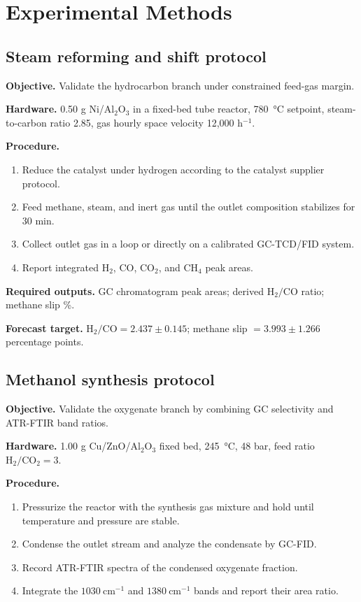 \documentclass[11pt]{article}
\begin{document}
\section{Experimental Methods}

\subsection{Steam reforming and shift protocol}

\textbf{Objective.} Validate the hydrocarbon branch under constrained feed-gas margin.

\textbf{Hardware.} 0.50 g Ni/Al\(_2\)O\(_3\) in a fixed-bed tube reactor, \SI{780}{\degreeCelsius} setpoint, steam-to-carbon ratio 2.85, gas hourly space velocity 12{,}000 h\(^{-1}\).

\textbf{Procedure.}
\begin{enumerate}[leftmargin=1.5em]
\item Reduce the catalyst under hydrogen according to the catalyst supplier protocol.
\item Feed methane, steam, and inert gas until the outlet composition stabilizes for 30 min.
\item Collect outlet gas in a loop or directly on a calibrated GC-TCD/FID system.
\item Report integrated \(\mathrm{H_2}\), \(\mathrm{CO}\), \(\mathrm{CO_2}\), and \(\mathrm{CH_4}\) peak areas.
\end{enumerate}

\textbf{Required outputs.} GC chromatogram peak areas; derived \(\mathrm{H_2/CO}\) ratio; methane slip \%.

\textbf{Forecast target.} \(\mathrm{H_2/CO} = 2.437 \pm 0.145\); methane slip \(= 3.993 \pm 1.266\) percentage points.

\subsection{Methanol synthesis protocol}

\textbf{Objective.} Validate the oxygenate branch by combining GC selectivity and ATR-FTIR band ratios.

\textbf{Hardware.} 1.00 g Cu/ZnO/Al\(_2\)O\(_3\) fixed bed, \SI{245}{\degreeCelsius}, 48 bar, feed ratio \(\mathrm{H_2/CO_2}=3\).

\textbf{Procedure.}
\begin{enumerate}[leftmargin=1.5em]
\item Pressurize the reactor with the synthesis gas mixture and hold until temperature and pressure are stable.
\item Condense the outlet stream and analyze the condensate by GC-FID.
\item Record ATR-FTIR spectra of the condensed oxygenate fraction.
\item Integrate the \(1030~\mathrm{cm^{-1}}\) and \(1380~\mathrm{cm^{-1}}\) bands and report their area ratio.
\end{enumerate}
\end{document}
